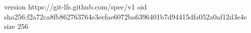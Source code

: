 version https://git-lfs.github.com/spec/v1
oid sha256:f2a72ca8fb862763764e3eefae6072ba6396401b7d94415dfa052a0af12d3e4e
size 256
